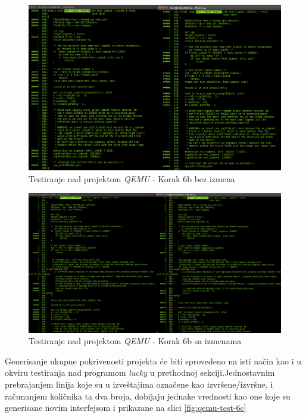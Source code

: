 \documentclass[12pt,oneside]{memoir}
\newcommand{\strano}[1]{\textit{#1}}
\begin{document}
\begin{figure}[!ht]
  \centering
  \includegraphics[width=\textwidth]{img/qemu-test-6b-1.png}
  \caption{Testiranje nad projektom \strano{QEMU} - Korak 6b bez izmena}
  \label{fig:qemu-test-6b-1}
\end{figure} 

\begin{figure}[!ht]
  \centering
  \includegraphics[width=\textwidth]{img/qemu-test-6b-2.png}
  \caption{Testiranje nad projektom \strano{QEMU} - Korak 6b sa izmenama}
  \label{fig:qemu-test-6b-2}
\end{figure} 

Generisanje ukupne pokrivenosti projekta će biti sprovedeno na isti način kao i u okviru testiranja nad programom \strano{lucky} u prethodnoj sekciji.Jednostavnim prebrajanjem linija koje su u izveštajima označene kao izvršene/izvršne, i računanjem količnika ta dva broja, dobijaju jednake vrednosti kao one koje su generisane novim interfejsom i prikazane na slici \ref{fig:qemu-test-6c}
\end{document}
